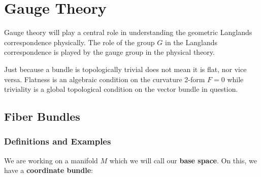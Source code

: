 \chapter{Gauge Theory\label{ch:gauge}}

	Gauge theory will play a central role in understanding the geometric Langlands correspondence physically. The role of the group $G$ in the Langlands correspondence is played by the gauge group in the physical theory. 
	

	
	\begin{nb}
		Just because a bundle is topologically trivial does not mean it is flat, nor vice versa. Flatness is an algebraic condition on the curvature 2-form $F = 0$ while triviality is a global topological condition on the vector bundle in question. 
	\end{nb}

	\section{Fiber Bundles}
	\subsection{Definitions and Examples}
		We are working on a manifold $M$ which we will call our \textbf{base space}. On this, we have a \textbf{coordinate bundle}:
		
